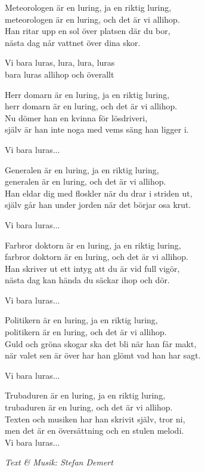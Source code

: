 Meteorologen är en luring, ja en riktig luring,\\
meteorologen är en luring, och det är vi allihop.\\
Han ritar upp en sol över platsen där du bor,\\
nästa dag når vattnet över dina skor.\par
\vspace{10pt}
Vi bara luras, lura, lura, luras\\
bara luras allihop och överallt\par
\vspace{10pt}
Herr domarn är en luring, ja en riktig luring,\\
herr domarn är en luring, och det är vi allihop.\\
Nu dömer han en kvinna för lösdriveri,\\
själv är han inte noga med vems säng han ligger i.\par
\vspace{10pt}
Vi bara luras...\par
\vspace{10pt}
Generalen är en luring, ja en riktig luring,\\
generalen är en luring, och det är vi allihop.\\
Han eldar dig med floskler när du drar i striden ut,\\
själv går han under jorden när det börjar osa krut.\par
\vspace{10pt}
Vi bara luras...\par
\vspace{10pt}
Farbror doktorn är en luring, ja en riktig luring,\\
farbror doktorn är en luring, och det är vi allihop.\\
Han skriver ut ett intyg att du är vid full vigör,\\
nästa dag kan hända du säckar ihop och dör.\par
\vspace{10pt}
Vi bara luras...\par
\vspace{10pt}
Politikern är en luring, ja en riktig luring,\\
politikern är en luring, och det är vi allihop.\\
Guld och gröna skogar ska det bli när han får makt,\\
när valet sen är över har han glömt vad han har sagt.\par
\vspace{10pt}
Vi bara luras...\par
\vspace{10pt}
Trubaduren är en luring, ja en riktig luring,\\
trubaduren är en luring, och det är vi allihop.\\
Texten och musiken har han skrivit själv, tror ni,\\
men det är en översättning och en stulen melodi.\\
Vi bara luras...\par
\vspace{10pt}
{\footnotesize\textit{Text \& Musik: Stefan Demert}}
